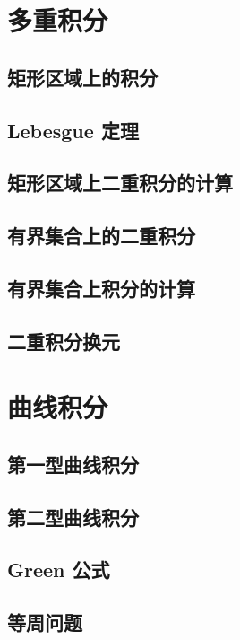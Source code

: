 \documentclass[a4paper, 11pt]{ctexbook}
\begin{document}
        \chapter{多重积分}
            \section{矩形区域上的积分}
            \section{Lebesgue 定理}
                
            \section{矩形区域上二重积分的计算}
                
            \section{有界集合上的二重积分}
                
            \section{有界集合上积分的计算}
                
            \section{二重积分换元}
                
        \chapter{曲线积分}
            \section{第一型曲线积分}
                
            \section{第二型曲线积分}
                
            \section{Green 公式}
                
            \section{等周问题}
\end{document}
